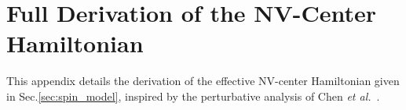 


\section{Full Derivation of the NV-Center Hamiltonian}
\label{app:nv_model}

This appendix details the derivation of the effective NV-center Hamiltonian given in Sec.\ref{sec:spin_model}, inspired by the perturbative analysis of Chen \emph{et al.}~\cite{Chen}.


